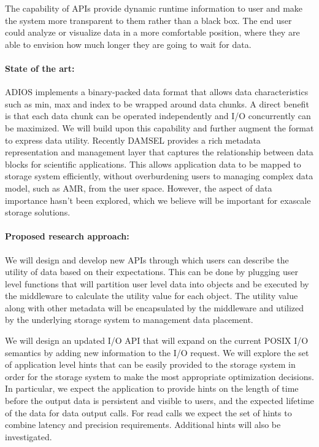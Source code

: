 The capability of APIs provide dynamic runtime information to user and make the system 
more transparent to them rather than a black box. The end user could analyze or visualize data 
in a more comfortable position, where they are able to envision 
how much longer they are going to wait for data. 

\paragraph{State of the art:} ADIOS implements a binary-packed data format that allows
data characteristics such as min, max and index to be wrapped around data chunks. A
direct benefit is that each data chunk can be operated independently and I/O concurrently
can be maximized. We will build upon this capability and further augment the format
to express data utility. Recently DAMSEL \cite{damsel} provides a rich metadata representation
and management layer that captures the relationship between data blocks for scientific applications.
This allows application data to be mapped to storage system efficiently, without overburdening
users to managing complex data model, such as AMR, from the user space. However, the aspect of 
data importance hasn't been explored, which we believe will be important for exascale storage solutions. 

\paragraph{Proposed research approach:} 
We will design and develop new APIs through which users can describe the utility of data
based on their expectations. This can be done by plugging user level functions that will
partition user level data into objects and be executed by the middleware to calculate the 
utility value for each object. The utility value along with other metadata will be encapsulated
by the middleware and utilized by the underlying storage system to management data placement.

We will design an updated I/O API that will expand on the current POSIX I/O
semantics by adding new information to the I/O request. We will explore the
set of application level hints that can be easily provided to the storage
system in order for the storage system to make the most appropriate
optimization decisions. In particular, we expect the application to provide
hints on the length of time before the output data is persistent and
visible to users, and the expected lifetime of the data for data output
calls. For read calls we expect the set of hints to combine latency and
precision requirements. Additional hints will also be investigated. 

